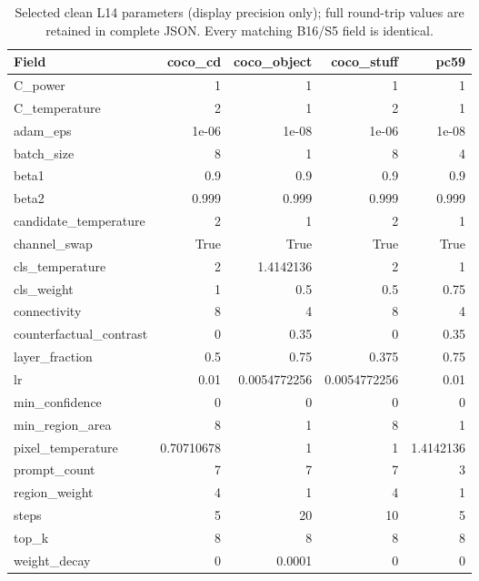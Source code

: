 \begin{table}[htbp]
\centering\scriptsize
\caption{Selected clean L14 parameters (display precision only); full round-trip values are retained in complete JSON. Every matching B16/S5 field is identical.}
\label{tab:params0}
\setlength{\tabcolsep}{4pt}
\begin{tabular}{lrrrr}
\toprule
Field & coco\_cd & coco\_object & coco\_stuff & pc59 \\
\midrule
C\_power & 1 & 1 & 1 & 1 \\
C\_temperature & 2 & 1 & 2 & 1 \\
adam\_eps & 1e-06 & 1e-08 & 1e-06 & 1e-08 \\
batch\_size & 8 & 1 & 8 & 4 \\
beta1 & 0.9 & 0.9 & 0.9 & 0.9 \\
beta2 & 0.999 & 0.999 & 0.999 & 0.999 \\
candidate\_temperature & 2 & 1 & 2 & 1 \\
channel\_swap & True & True & True & True \\
cls\_temperature & 2 & 1.4142136 & 2 & 1 \\
cls\_weight & 1 & 0.5 & 0.5 & 0.75 \\
connectivity & 8 & 4 & 8 & 4 \\
counterfactual\_contrast & 0 & 0.35 & 0 & 0.35 \\
layer\_fraction & 0.5 & 0.75 & 0.375 & 0.75 \\
lr & 0.01 & 0.0054772256 & 0.0054772256 & 0.01 \\
min\_confidence & 0 & 0 & 0 & 0 \\
min\_region\_area & 8 & 1 & 8 & 1 \\
pixel\_temperature & 0.70710678 & 1 & 1 & 1.4142136 \\
prompt\_count & 7 & 7 & 7 & 3 \\
region\_weight & 4 & 1 & 4 & 1 \\
steps & 5 & 20 & 10 & 5 \\
top\_k & 8 & 8 & 8 & 8 \\
weight\_decay & 0 & 0.0001 & 0 & 0 \\
\bottomrule
\end{tabular}
\end{table}

